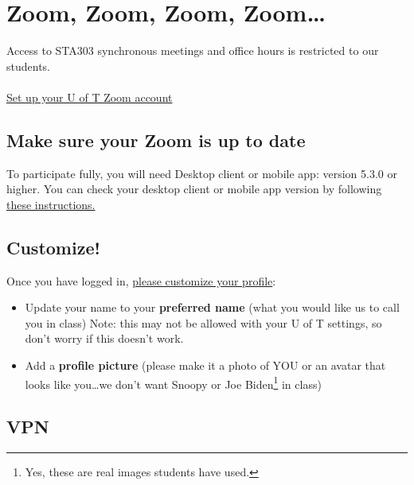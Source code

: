 \documentclass[
  openany]{book}
\begin{document}
\hypertarget{zoomzoomzoomzoom}{%
\section{Zoom, Zoom, Zoom, Zoom\ldots{}}\label{zoomzoomzoomzoom}}

\hfill\break
Access to STA303 synchronous meetings and office hours is restricted to our students.\\
~\\

\href{https://utoronto.zoom.us/signin}{Set up your U of T Zoom account}

\hypertarget{make-sure-your-zoom-is-up-to-date}{%
\subsection{Make sure your Zoom is up to date}\label{make-sure-your-zoom-is-up-to-date}}

To participate fully, you will need Desktop client or mobile app: version 5.3.0 or higher. You can check your desktop client or mobile app version by following \href{https://support.zoom.us/hc/en-us/articles/201362393-Viewing-the-Zoom-version-number}{these instructions.}

\hypertarget{customize}{%
\subsection{Customize!}\label{customize}}

Once you have logged in, \href{https://support.zoom.us/hc/en-us/articles/201363203-Customizing-your-Profile}{please customize your profile}:

\begin{itemize}
\item
  Update your name to your \textbf{preferred name} (what you would like us to call you in class) Note: this may not be allowed with your U of T settings, so don't worry if this doesn't work.
\item
  Add a \textbf{profile picture} (please make it a photo of YOU or an avatar that looks like you\ldots we don't want Snoopy or Joe Biden\footnote{Yes, these are real images students have used.} in class)
\end{itemize}

\hypertarget{vpn}{%
\subsection{VPN}\label{vpn}}
\end{document}
